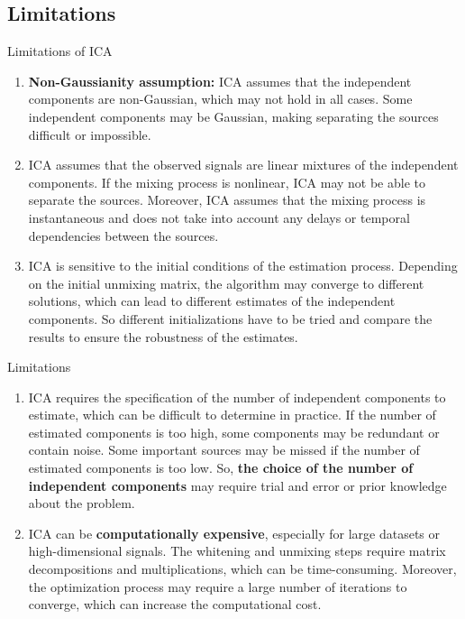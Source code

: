 \documentclass{beamer}
\begin{document}
\subsection{Limitations}
\begin{frame}{Limitations of ICA}
    \begin{enumerate}
        \item \textbf{Non-Gaussianity assumption: }ICA assumes that the independent components are non-Gaussian, which may not hold in all cases. Some independent components may be Gaussian, making separating the sources difficult or impossible. 
        \item ICA assumes that the observed signals are linear mixtures of the independent components. If the mixing process is nonlinear, ICA may not be able to separate the sources. Moreover, ICA assumes that the mixing process is instantaneous and does not take into account any delays or temporal dependencies between the sources.
        \item ICA is sensitive to the initial conditions of the estimation process. Depending on the initial unmixing matrix, the algorithm may converge to different solutions, which can lead to different estimates of the independent components. So different initializations have to be tried and compare the results to ensure the robustness of the estimates.
    \end{enumerate}
\end{frame}

\begin{frame}{Limitations}
    \begin{enumerate}
        \item ICA requires the specification of the number of independent components to estimate, which can be difficult to determine in practice. If the number of estimated components is too high, some components may be redundant or contain noise. Some important sources may be missed if the number of estimated components is too low. So, \textbf{the choice of the number of independent components} may require trial and error or prior knowledge about the problem.
        \item ICA can be \textbf{computationally expensive}, especially for large datasets or high-dimensional signals. The whitening and unmixing steps require matrix decompositions and multiplications, which can be time-consuming. Moreover, the optimization process may require a large number of iterations to converge, which can increase the computational cost.
    \end{enumerate}
\end{frame}
\end{document}
